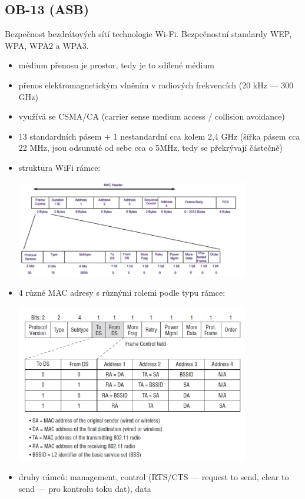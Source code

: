\subsection{OB-13 (ASB)}
Bezpečnost bezdrátových sítí technologie Wi-Fi. Bezpečnostní standardy WEP, WPA, WPA2 a WPA3.

\begin{itemize}
	\item médium přenosu je prostor, tedy je to sdílené médium
	\item přenos elektromagnetickým vlněním v radiových frekvencích (20 kHz --- 300 GHz)
	\item využívá se CSMA/CA (carrier sense medium access / collision avoidance)
	\item 13 standardních pásem + 1 nestandardní cca kolem 2,4 GHz (šířka pásem cca 22 MHz, jsou odsunuté od sebe cca o 5MHz, tedy se překrývají částečně)
	\item struktura WiFi rámce:
	
	\includegraphics[width=0.8\textwidth]{img/OB-13_0.jpg}
	
	\item 4 různé MAC adresy s různými rolemi podle typu rámce:
	
	\includegraphics[width=0.8\textwidth]{img/OB-13_1.jpg}
	
	\item druhy rámců: management, control (RTS/CTS --- request to send, clear to send --- pro kontrolu toku dat), data
	

\end{itemize}
